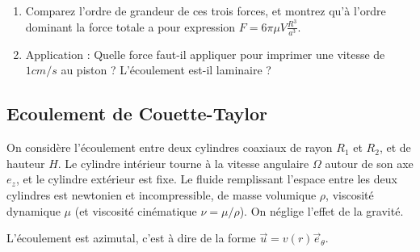 \begin{enumerate}

\item Comparez l'ordre de grandeur de ces trois forces, et montrez qu'à l'ordre dominant la force totale a pour expression $F = 6 \pi \mu V \frac{R^3}{a^3}$.


\item Application : Quelle force faut-il appliquer pour imprimer une vitesse de $1cm/s$ au piston ? L’écoulement est-il laminaire ? 




\end{enumerate}



\subsection{Ecoulement de Couette-Taylor}

\begin{center}

\end{center}



On considère l'écoulement entre deux cylindres coaxiaux de rayon 
$R_1$ et $R_2$, et de hauteur $H$.
Le cylindre intérieur tourne à la vitesse angulaire $\Omega$ autour
de son axe $e_z$, et le cylindre extérieur est fixe. 
Le fluide remplissant l'espace entre les deux cylindres est 
newtonien et incompressible, 
de masse volumique $\rho$, viscosité dynamique $\mu$ 
(et viscosité cinématique $\nu=\mu/\rho$). On néglige l'effet de la gravité.

L'écoulement est azimutal, c'est à dire de la forme 
$\vec u = v(r) \vec e_\theta$. 


